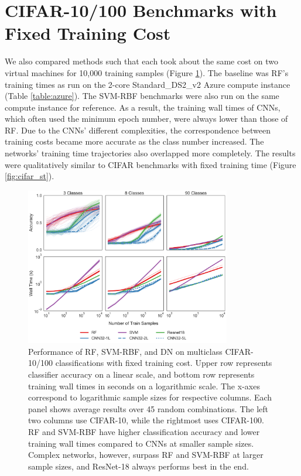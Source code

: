 \section{CIFAR-10/100 Benchmarks with Fixed Training Cost}
\label{cifar_sc}
We also compared methods such that each took about the same cost on two virtual machines for 10,000 training samples (Figure \ref{fig:cifar_sc}). The baseline was RF's training times as run on the 2-core Standard\_DS2\_v2 Azure compute instance (Table \ref{table:azure}). The SVM-RBF benchmarks were also run on the same compute instance for reference. As a result, the training wall times of CNNs, which often used the minimum epoch number, were always lower than those of RF. Due to the CNNs' different complexities, the correspondence between training costs became more accurate as the class number increased. The networks' training time trajectories also overlapped more completely. The results were qualitatively similar to CIFAR benchmarks with fixed training time (Figure \ref{fig:cifar_st}).

\begin{figure}[!htb]
\centering
\includegraphics[width=0.8\textwidth]{figures/cifar_sc.pdf}
  \caption{Performance of RF, SVM-RBF, and DN on multiclass CIFAR-10/100 classifications with fixed training cost.
  Upper row represents classifier accuracy on a linear scale, and bottom row represents training wall times in seconds on a logarithmic scale. The x-axes correspond to logarithmic sample sizes for respective columns. Each panel shows average results over 45 random combinations. The left two columns use CIFAR-10, while the rightmost uses CIFAR-100.
  RF and SVM-RBF have higher classification accuracy and lower training wall times compared to CNNs at smaller sample sizes. Complex networks, however, surpass RF and SVM-RBF at larger sample sizes, and ResNet-18 always performs best in the end.
  }
\label{fig:cifar_sc}
\end{figure}
\vfil\eject

